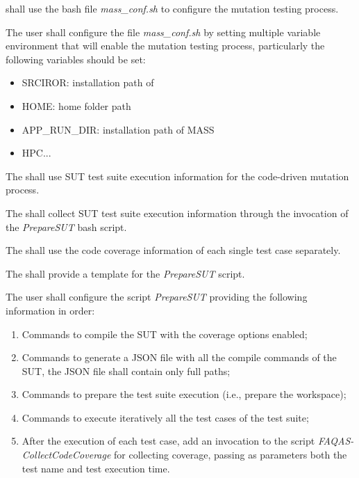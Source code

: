 \RQ{} \FAQAS shall use the bash file \textit{mass\_conf.sh} to configure the mutation testing process.

\RQ{} The user shall configure the file \textit{mass\_conf.sh} by setting multiple variable environment that will enable the mutation testing process, particularly the following variables should be set:
 \begin{itemize}
 	\item SRCIROR: installation path of \FAQAS
 	\item HOME: home folder path
 	\item APP\_RUN\_DIR: installation path of MASS
 	\item HPC...
 \end{itemize}

\RQ{} The \FAQAS shall use SUT test suite execution information for the code-driven mutation process.

\RQ{} The \FAQAS shall collect SUT test suite execution information through the invocation of the \textit{PrepareSUT} bash script.

\RQ{} The \FAQAS shall use the code coverage information of each single test case separately. 

\RQ{} The \FAQAS shall provide a template for the \textit{PrepareSUT} script.

\RQ{} The user shall configure the script \textit{PrepareSUT} providing the following information in order:
 \begin{enumerate}
 	\item Commands to compile the SUT with the coverage options enabled;
 	\item Commands to generate a JSON file with all the compile commands of the SUT, the JSON file shall contain only full paths;
 	\item Commands to prepare the test suite execution (i.e., prepare the workspace);
 	\item Commands to execute iteratively all the test cases of the test suite;
 	\item After the execution of each test case, add an invocation to the script \textit{FAQAS-CollectCodeCoverage} for collecting coverage, passing as parameters both the test name and test execution time.
 \end{enumerate}


